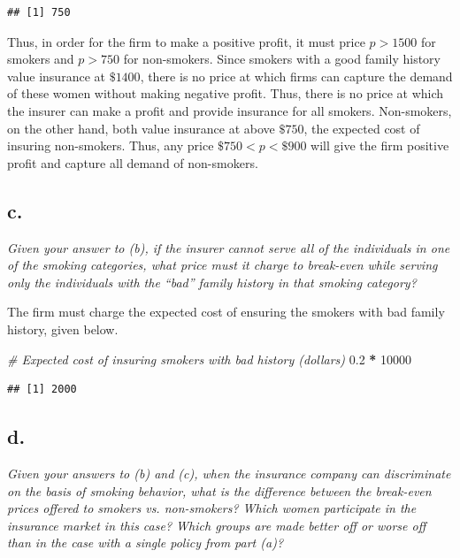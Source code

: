 \documentclass[
]{article}
\newenvironment{Shaded}{\begin{snugshade}}{\end{snugshade}}
\newcommand{\CommentTok}[1]{\textcolor[rgb]{0.56,0.35,0.01}{\textit{#1}}}
\newcommand{\DecValTok}[1]{\textcolor[rgb]{0.00,0.00,0.81}{#1}}
\newcommand{\FloatTok}[1]{\textcolor[rgb]{0.00,0.00,0.81}{#1}}
\newcommand{\OperatorTok}[1]{\textcolor[rgb]{0.81,0.36,0.00}{\textbf{#1}}}
\newcommand{\StringTok}[1]{\textcolor[rgb]{0.31,0.60,0.02}{#1}}
\begin{document}
\begin{verbatim}
## [1] 750
\end{verbatim}

Thus, in order for the firm to make a positive profit, it must price
\(p>1500\) for smokers and \(p>750\) for non-smokers. Since smokers with
a good family history value insurance at \(\$1400\), there is no price
at which firms can capture the demand of these women without making
negative profit. Thus, there is no price at which the insurer can make a
profit and provide insurance for all smokers. Non-smokers, on the other
hand, both value insurance at above \(\$750\), the expected cost of
insuring non-smokers. Thus, any price \(\$750 < p < \$900\) will give
the firm positive profit and capture all demand of non-smokers.

\hypertarget{c.-1}{%
\subsection{c.~}\label{c.-1}}

\textit{Given your answer to (b), if the insurer cannot serve all of the individuals in one of the smoking categories, what price must it charge to break-even while serving only the individuals with the “bad” family history in that smoking category?}

The firm must charge the expected cost of ensuring the smokers with bad
family history, given below.

\begin{Shaded}
\begin{Highlighting}[]
\CommentTok{# Expected cost of insuring smokers with bad history (dollars)}
\FloatTok{0.2} \OperatorTok{*}\StringTok{ }\DecValTok{10000}
\end{Highlighting}
\end{Shaded}

\begin{verbatim}
## [1] 2000
\end{verbatim}

\hypertarget{d.}{%
\subsection{d.~}\label{d.}}

\textit{Given your answers to (b) and (c), when the insurance company can discriminate on the basis of smoking behavior, what is the difference between the break-even prices offered to smokers vs. non-smokers? Which women participate in the insurance market in this case? Which groups are made better off or worse off than in the case with a single policy from part (a)?}
\end{document}
